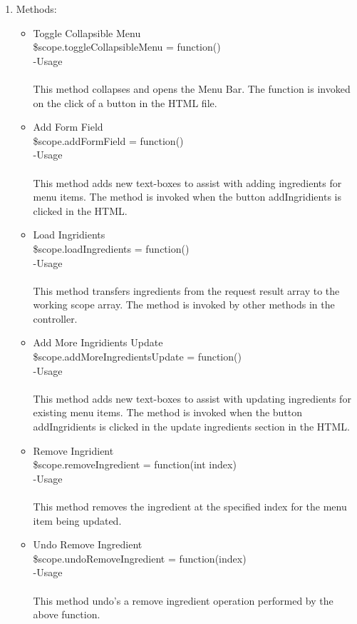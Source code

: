 \documentclass[a4paper,12pt]{article}
\begin{document}
\begin{enumerate}
\item Methods:
	\begin{itemize}
		\item Toggle Collapsible Menu\\
		\$scope.toggleCollapsibleMenu = function()\\
		-Usage\\ \\
		This method collapses and opens the Menu Bar. The function is invoked on the click of a button in the HTML file.
		\item Add Form Field\\
		\$scope.addFormField = function()\\
		-Usage\\ \\
		This method adds new text-boxes to assist with adding ingredients for menu items. The method is invoked when the button addIngridients is clicked in the HTML.
		\item Load Ingridients\\
		\$scope.loadIngredients = function()\\
		-Usage\\ \\
		This method transfers ingredients from the request result array to the working scope array. The method is invoked by other methods in the controller.
		\item Add More Ingridients Update\\
		\$scope.addMoreIngredientsUpdate = function()\\
		-Usage\\ \\
		This method adds new text-boxes to assist with updating ingredients for existing menu items. The method is invoked when the button addIngridients is clicked in the update ingredients section in the HTML.
		\item Remove Ingridient\\
		\$scope.removeIngredient = function(int index)\\
		-Usage\\ \\
		This method removes the ingredient at the specified index for the menu item being updated.
		\item Undo Remove Ingredient\\
		\$scope.undoRemoveIngredient = function(index)\\
		-Usage\\ \\
		This method undo's a remove ingredient operation performed by the above function.

\end{itemize}
\end{enumerate}
\end{document}
